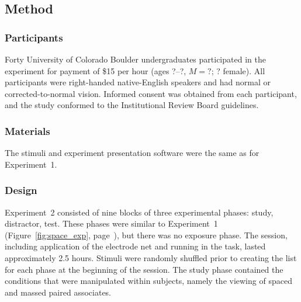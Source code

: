 \subsection{Method}

\subsubsection{Participants}


Forty University of Colorado Boulder undergraduates participated in the experiment for payment of \$15 per hour (ages ?--?, $M=?$; ? female).  All participants were right-handed native-English speakers and had normal or corrected-to-normal vision.  Informed consent was obtained from each participant, and the study conformed to the Institutional Review Board guidelines.

\subsubsection{Materials}

The stimuli and experiment presentation software were the same as for Experiment~1.

\subsubsection{Design}


Experiment~2 consisted of nine blocks of three experimental phases:
study, distractor, test.  These phases were similar to Experiment~1 (Figure~\ref{fig:space_exp}, page~\pageref{fig:space_exp}), but there was no exposure phase.  The session, including application of the electrode net and running in the task, lasted approximately 2.5 hours.  Stimuli were randomly shuffled prior to creating the list for each phase at the beginning of the session.  The study phase contained the conditions that were manipulated within subjects, namely the viewing of spaced and massed paired associates.

